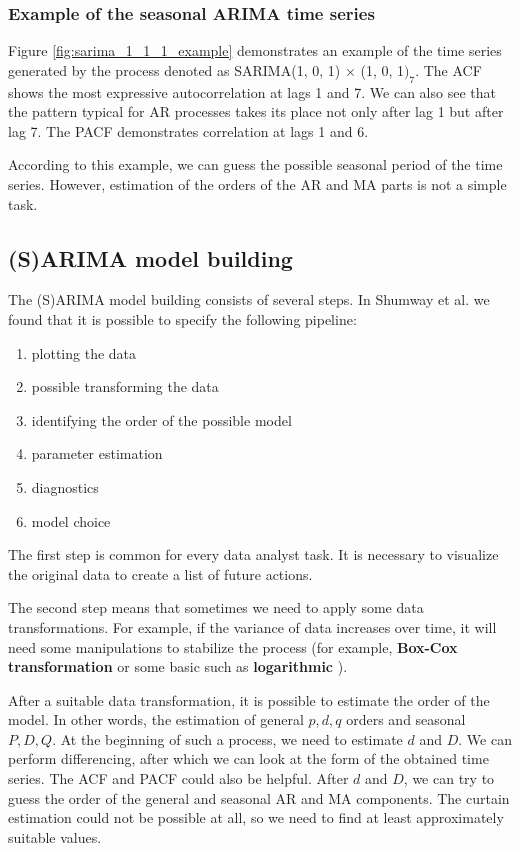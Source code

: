 \subsubsection{Example of the seasonal ARIMA time series}

Figure \ref{fig:sarima_1_1_1_example} demonstrates an example of the time series generated by the process denoted as SARIMA(1, 0, 1) $\times$ (1, 0, 1$)_7$. The ACF shows the most expressive autocorrelation at lags 1 and 7. We can also see that the pattern typical for AR processes takes its place not only after lag 1 but after lag 7. The PACF demonstrates correlation at lags 1 and 6.

According to this example, we can guess the possible seasonal period of the time series. However, estimation of the orders of the AR and MA parts is not a simple task.

\subsection{(S)ARIMA model building}

The (S)ARIMA model building consists of several steps. In Shumway et al. \cite{shumway2011} we found that it is possible to specify the following pipeline:
\begin{enumerate}
    \item plotting the data
    \item possible transforming the data
    \item identifying the order of the possible model
    \item parameter estimation
    \item diagnostics
    \item model choice
\end{enumerate}
The first step is common for every data analyst task. It is necessary to visualize the original data to create a list of future actions.

The second step means that sometimes we need to apply some data transformations. For example, if the variance of data increases over time, it will need some manipulations to stabilize the process (for example, \textbf{Box-Cox transformation} or some basic such as \textbf{logarithmic} \cite{osborne2010}). 

After a suitable data transformation, it is possible to estimate the order of the model. In other words, the estimation of general $p, d, q$ orders and seasonal $P, D, Q$. At the beginning of such a process, we need to estimate $d$ and $D$. We can perform differencing, after which we can look at the form of the obtained time series. The ACF and PACF could also be helpful. After $d$ and $D$, we can try to guess the order of the general and seasonal AR and MA components. The curtain estimation could not be possible at all, so we need to find at least approximately suitable values.

